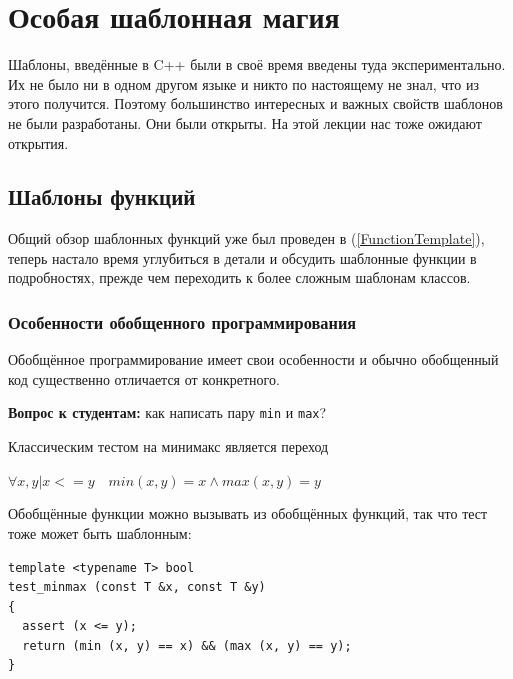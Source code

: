 \documentclass[a4paper,12pt,oneside]{article}
\newif\ifanswers
\begin{document}
\pagebreak
\section{Особая шаблонная магия}

Шаблоны, введённые в C++ были в своё время введены туда экспериментально. Их не было ни в одном другом языке и никто по настоящему не знал, что из этого получится. Поэтому большинство интересных и важных свойств шаблонов не были разработаны. Они были открыты. На этой лекции нас тоже ожидают открытия.

\subsection{Шаблоны функций}\label{FunctionTemplates}

Общий обзор шаблонных функций уже был проведен в (\ref{FunctionTemplate}), теперь настало время углубиться в детали и обсудить шаблонные функции в подробностях, прежде чем переходить к более сложным шаблонам классов.

\subsubsection{Особенности обобщенного программирования}\label{GenericCode}

Обобщённое программирование имеет свои особенности и обычно обобщенный код существенно отличается от конкретного.

\textbf{Вопрос к студентам:} как написать пару \lstinline!min! и \lstinline!max!?

\ifanswers
Возможный вариант ответа:

\begin{lstlisting}
template <class T> const T&
max (const T &x, const T &y)
{
  return ((x > y) ? x : y);
}

template <class T> const T&
min (const T &x, const T &y)
{
  return ((x < y) ? x : y);
}
\end{lstlisting}
\fi

Классическим тестом на минимакс является переход 

$\forall x, y | x <= y \quad min(x,y) = x \wedge max(x, y) = y$

Обобщённые функции можно вызывать из обобщённых функций, так что тест тоже может быть шаблонным:

\begin{lstlisting}
template <typename T> bool
test_minmax (const T &x, const T &y)
{
  assert (x <= y);
  return (min (x, y) == x) && (max (x, y) == y);
}

\end{lstlisting}
\end{document}
